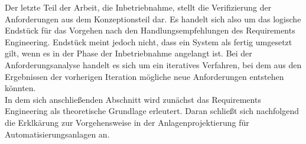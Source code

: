 \documentclass[../../Bachelorarbeit.tex]{subfiles}
\begin{document}
Der letzte Teil der Arbeit, die Inbetriebnahme, stellt die Verifizierung der Anforderungen aus dem Konzeptionsteil dar. Es handelt sich also um das logische Endstück für das Vorgehen nach den Handlungsempfehlungen des Requirements Engineering. Endstück meint jedoch nicht, dass ein System als fertig umgesetzt gilt, wenn es in der Phase der Inbetriebnahme angelangt ist. Bei der Anforderungsanalyse handelt es sich um ein iteratives Verfahren, bei dem aus den Ergebnissen der vorherigen Iteration mögliche neue Anforderungen entstehen könnten.\\ %
In dem sich anschließenden Abschnitt wird zunächst das Requirements Engineering als theoretische Grundlage erleutert. Daran schließt sich nachfolgend die Erklkärung zur Vorgehensweise in der Anlagenprojektierung für Automatisierungsanlagen an. 
\end{document}
